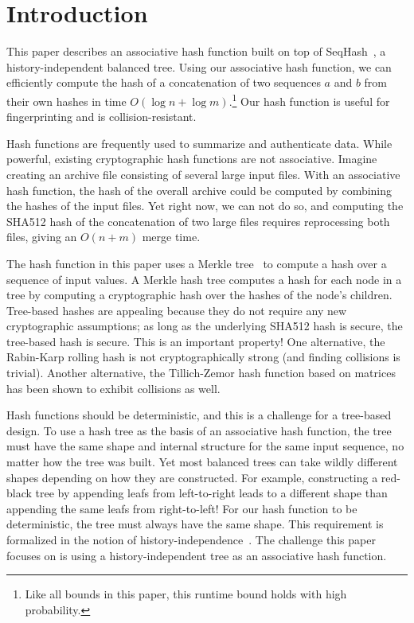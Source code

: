 \section{Introduction}

This paper describes an associative hash function built on top of
SeqHash~\cite{versum:ccs14}, a history-independent balanced tree. Using our
associative hash function, we can efficiently compute the hash of a
concatenation of two sequences $a$ and $b$ from their own hashes in time
$O(\log n + \log m)$.\footnote{Like all bounds in this paper, this runtime
bound holds with high probability.} Our hash function is useful for
fingerprinting and is collision-resistant.

Hash functions are frequently used to summarize and authenticate data. While
powerful, existing cryptographic hash functions are not associative. Imagine
creating an archive file consisting of several large input files. With an
associative hash function, the hash of the overall archive could be computed by
combining the hashes of the input files. Yet right now, we can not do so, and
computing the SHA512 hash of the concatenation of two large files requires
reprocessing both files, giving an $O(n + m)$ merge time.

The hash function in this paper uses a Merkle
tree~\cite{merkle:sig-conventional} to compute a hash over a sequence of input
values. A Merkle hash tree computes a hash for each node in a tree by computing
a cryptographic hash over the hashes of the node's children. Tree-based hashes
are appealing because they do not require any new cryptographic assumptions; as
long as the underlying SHA512 hash is secure, the tree-based hash is secure.
This is an important property! One alternative, the Rabin-Karp rolling hash is
not cryptographically strong (and finding collisions is trivial). Another
alternative, the Tillich-Zemor hash function based on matrices has been shown
to exhibit collisions as well. %

Hash functions should be deterministic, and this is a challenge for a
tree-based design. To use a hash tree as the basis of an associative hash
function, the tree must have the same shape and internal structure for the same
input sequence, no matter how the tree was built. Yet most balanced trees can
take wildly different shapes depending on how they are constructed. For
example, constructing a red-black tree by appending leafs from left-to-right
leads to a different shape than appending the same leafs from right-to-left!
For our hash function to be deterministic, the tree must always have the same
shape.  This requirement is formalized in the notion of
history-independence~\cite{naor:hids}. The challenge this paper focuses on is
using a history-independent tree as an associative hash function. 

